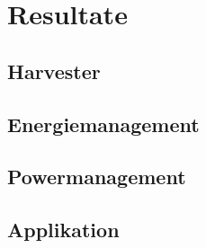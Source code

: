 \chapter{Resultate}
\section{Harvester}
\section{Energiemanagement}
\section{Powermanagement}
\section{Applikation}









